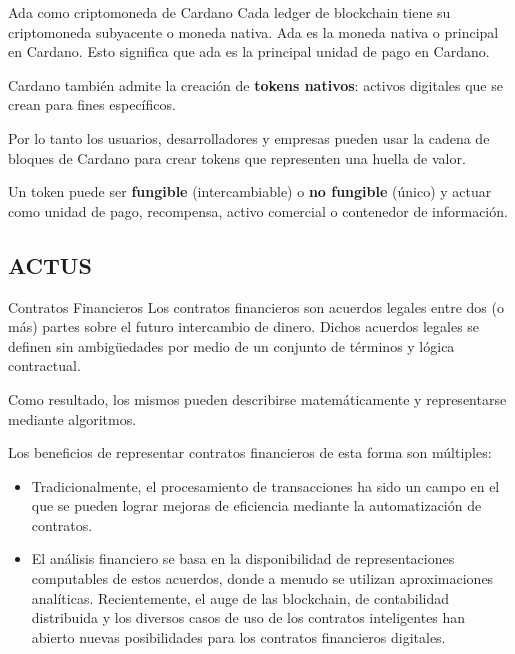 \documentclass{beamer}
\begin{document}
\begin{frame}{Ada como criptomoneda de Cardano}
Cada ledger de blockchain tiene su criptomoneda subyacente o moneda nativa. Ada es la moneda
nativa o principal en Cardano. Esto significa que ada es la principal unidad de pago en Cardano.

\pause
\medskip

Cardano también admite la creación de \textbf{tokens nativos}: activos digitales que se crean para fines
específicos. 

\medskip
\pause

Por lo tanto los usuarios, desarrolladores y empresas pueden usar la cadena de bloques de Cardano para crear tokens que representen una huella de valor.

\pause
\medskip

Un token puede ser \textbf{fungible} (intercambiable) o \textbf{no fungible} (único) y actuar como unidad de pago, recompensa, activo
comercial o contenedor de información.

\end{frame}


\subsection{ACTUS}

\begin{frame}{Contratos Financieros}
Los contratos financieros son acuerdos legales entre dos (o más) partes sobre el futuro intercambio de dinero. Dichos acuerdos legales se definen sin ambigüedades por medio de un conjunto de términos y lógica contractual.

\pause
\vfill

Como resultado, los mismos pueden describirse matemáticamente y representarse mediante algoritmos.

\end{frame}

\begin{frame}
Los beneficios de representar contratos financieros de esta forma son múltiples:

\begin{itemize}
    \pause

    \item Tradicionalmente, el procesamiento de transacciones ha sido un campo en el que se pueden lograr mejoras de eficiencia mediante la automatización de contratos.

    \pause

    \item El análisis financiero se basa en la disponibilidad de representaciones computables de estos acuerdos, donde a menudo se utilizan aproximaciones analíticas. \pause Recientemente, el auge de las blockchain, de contabilidad distribuida y los diversos casos de uso de los contratos inteligentes han abierto nuevas posibilidades para los contratos financieros digitales.
\end{itemize}

\end{frame}
\end{document}
